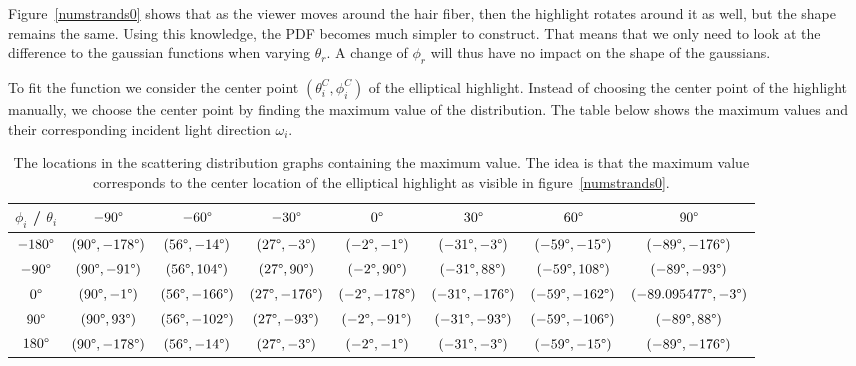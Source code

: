 \documentclass[11pt,a4paper]{report}
\begin{document}
Figure~\ref{numstrands0} shows that as the viewer moves around the hair fiber, then the highlight rotates around it as well, but the shape remains the same. Using this knowledge, the PDF becomes much simpler to construct. That means that we only need to look at the difference to the gaussian functions when varying $\theta_r$. A change of $\phi_r$ will thus have no impact on the shape of the gaussians.

To fit the function we consider the center point $(\theta_i^C, \phi_i^C)$ of the elliptical highlight. Instead of choosing the center point of the highlight manually, we choose the center point by finding the maximum value of the distribution. The table below shows the maximum values and their corresponding incident light direction $\omega_i$.

\begin{table}
\begin{center}
\begin{tabular}{c||c|c|c|c|c|c|c|}

$\phi_i$ / $\theta_i$ & $-90\degree$ & $-60\degree$ & $-30\degree$ & $0\degree$ & $30\degree$ & $60\degree$ & $90\degree$ \\ \hline \hline
$-180\degree$ & $(90\degree, -178\degree)$  & $(56\degree, -14\degree)$ & $(27\degree, -3\degree)$ & $(-2\degree, -1\degree)$ & $(-31\degree, -3\degree)$ & $(-59\degree, -15\degree)$ & $(-89\degree, -176\degree)$ \\ \hline
$-90\degree$ & $(90\degree, -91\degree)$ & $(56\degree, 104\degree)$ & $(27\degree, 90\degree)$ & $(-2\degree, 90\degree)$ & $(-31\degree, 88\degree)$ & $(-59\degree, 108\degree)$ & $(-89\degree, -93\degree)$ \\ \hline
$0\degree$ & $(90\degree, -1\degree)$ & $(56\degree, -166\degree)$ &$(27\degree, -176\degree)$ & $(-2\degree, -178\degree)$ & $(-31\degree, -176\degree)$ &$(-59\degree, -162\degree)$  & $(-89.095477\degree, -3\degree)$ \\ \hline
$90\degree$ & $(90\degree, 93\degree)$ & $(56\degree, -102\degree)$ & $(27\degree, -93\degree)$ & $(-2\degree, -91\degree)$ & $(-31\degree, -93\degree)$ & $(-59\degree, -106\degree)$ & $(-89\degree, 88\degree)$ \\ \hline
$180\degree$ & $(90\degree, -178\degree)$ & $(56\degree, -14\degree)$ & $(27\degree, -3\degree)$ & $(-2\degree, -1\degree)$ & $(-31\degree, -3\degree)$ & $(-59\degree, -15\degree)$ & $(-89\degree, -176\degree)$ \\ \hline
\end{tabular}
\caption{The locations in the scattering distribution graphs containing the maximum value. The idea is that the maximum value corresponds to the center location of the elliptical highlight as visible in figure~\ref{numstrands0}.}
\end{center}
\end{table}
 
\end{document}
